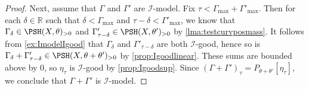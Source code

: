 \begin{proof}
    Next, assume that $\Gamma$ and $\Gamma'$ are $\mathcal{I}$-model. Fix $\tau<\Gamma_{\max}+\Gamma'_{\max}$. Then for each $\delta\in \mathbb{R}$ such that $\delta<\Gamma_{\max}$ and $\tau-\delta<\Gamma'_{\max}$, we know that $\Gamma_\delta\in \PSH(X,\theta)_{>0}$ and $\Gamma'_{\tau-\delta}\in \PSH(X,\theta')_{>0}$ by \cref{lma:testcurvposmass}.
    It follows from \cref{ex:ImodelIgood} that $\Gamma_\delta$ and $\Gamma'_{\tau-\delta}$ are both $\mathcal{I}$-good, hence so is $\Gamma_\delta+\Gamma'_{\tau-\delta}\in \PSH(X,\theta+\theta')_{>0}$ by \cref{prop:Igoodlinear}. These sums are bounded above by $0$, so $\eta_{\tau}$ is $\mathcal{I}$-good by \cref{prop:Igoodsup}. Since $(\Gamma+\Gamma')_\tau=P_{\theta+\theta'}[\eta_\tau]$, we conclude that $\Gamma+\Gamma'$ is $\mathcal{I}$-model.
\end{proof}


